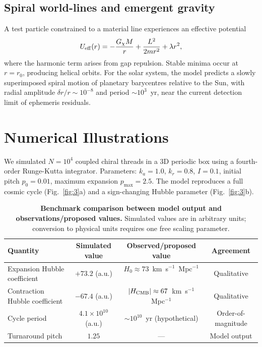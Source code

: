 \documentclass[12pt,a4paper]{article}
\begin{document}
\subsection*{Spiral world-lines and emergent gravity}

A test particle constrained to a material line experiences an effective potential
\begin{equation}
    U_{\rm eff}(r) = -\frac{G_\chi M}{r} + \frac{L^2}{2mr^2} + \lambda r^2,
\end{equation}
where the harmonic term arises from gap repulsion. Stable minima occur at $r=r_0$, producing helical orbits. For the solar system, the model predicts a slowly superimposed spiral motion of planetary barycentres relative to the Sun, with radial amplitude $\delta r/r\sim 10^{-8}$ and period $\sim 10^3$~yr, near the current detection limit of ephemeris residuals.

\section*{Numerical Illustrations}

We simulated $N=10^4$ coupled chiral threads in a 3D periodic box using a fourth-order Runge-Kutta integrator. Parameters: $k_a=1.0$, $k_r=0.8$, $I=0.1$, initial pitch $p_0=0.01$, maximum expansion $p_{\max}=2.5$. The model reproduces a full cosmic cycle (Fig.~\ref{fig:3}a) and a sign-changing Hubble parameter (Fig.~\ref{fig:3}b).

\begin{table}[htbp]
\centering
\caption{\textbf{Benchmark comparison between model output and observations/proposed values.} Simulated values are in arbitrary units; conversion to physical units requires one free scaling parameter.}
\label{tab:1}
\begin{tabular}{@{}lccc@{}}
\toprule
Quantity & Simulated value & Observed/proposed value & Agreement \\
\midrule
Expansion Hubble coefficient & $+73.2$ (a.u.) & $H_0\approx 73$~km~s$^{-1}$~Mpc$^{-1}$~\cite{riess2016} & Qualitative \\
Contraction Hubble coefficient & $-67.4$ (a.u.) & $|H_{\rm CMB}|\approx 67$~km~s$^{-1}$~Mpc$^{-1}$~\cite{planck2020} & Qualitative \\
Cycle period & $4.1\times 10^{10}$ (a.u.) & $\sim 10^{10}$~yr (hypothetical) & Order-of-magnitude \\
Turnaround pitch & $1.25$ & --- & Model output \\
\bottomrule
\end{tabular}
\end{table}
\end{document}
